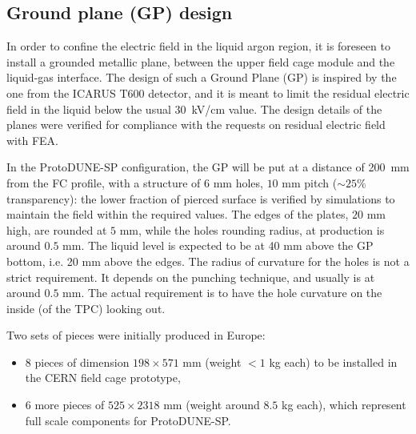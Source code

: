 \subsection{Ground plane (GP) design}

In order to confine the electric field in the liquid argon region, it is foreseen to install a grounded metallic plane,  between the upper field cage module and the liquid-gas interface. The design of such a Ground Plane (GP)  is inspired by the one from the ICARUS T600 detector, and it is meant to limit the residual electric field in the liquid below the usual 30~kV/cm value. 
The design details of the planes were verified for compliance with the requests on residual electric field with FEA.  

In the ProtoDUNE-SP configuration, the GP will be put at a distance of 200~mm from the FC profile, with a structure of $6$ mm holes, $10$ mm pitch ($\sim 25\%$ transparency): the lower fraction of pierced surface is verified by simulations to maintain the field within the required values. The edges of the plates, $20$ mm high, are rounded at $5$ mm, while the holes rounding radius, at production is around $0.5$ mm. The liquid level is expected to be at 40 mm above the GP bottom, i.e. 20 mm above the edges. The radius of curvature for the holes is not a strict requirement. It depends on the punching technique, and usually is at around $0.5$ mm. The actual requirement is to have the hole curvature on the inside (of the TPC) looking out.

Two sets of pieces  were initially produced in Europe:
\begin{itemize}
\item 8 pieces of dimension $198 \times 571$ mm (weight $< 1$ kg each) to be installed in the CERN field cage prototype,
\item 6 more pieces of  $525 \times 2318$ mm (weight around $8.5$ kg each), which represent full scale components for ProtoDUNE-SP. %
\end{itemize}




